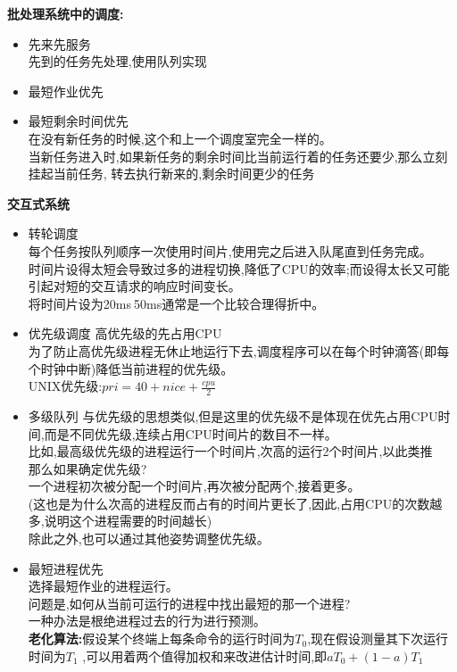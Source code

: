 \documentclass[UTF8,a4paper]{ctexart}
\newcommand{\spaceline}{\vspace{\baselineskip}}
\begin{document}
    \spaceline
    \textbf{批处理系统中的调度:}
    \begin{itemize}
      \item 先来先服务\\
      先到的任务先处理,使用队列实现
      \item 最短作业优先\\
      \item 最短剩余时间优先\\
      在没有新任务的时候,这个和上一个调度室完全一样的。\\
      当新任务进入时,如果新任务的剩余时间比当前运行着的任务还要少,那么立刻挂起当前任务,
      转去执行新来的,剩余时间更少的任务
    \end{itemize}

    \spaceline
    \textbf{交互式系统}
    \begin{itemize}
      \item 转轮调度\\
      每个任务按队列顺序一次使用时间片,使用完之后进入队尾直到任务完成。\\
      时间片设得太短会导致过多的进程切换,降低了CPU的效率;而设得太长又可能引起对短的交互请求的响应时间变长。\\
      将时间片设为20ms$~$50ms通常是一个比较合理得折中。

      \item 优先级调度
      高优先级的先占用CPU\\
      为了防止高优先级进程无休止地运行下去,调度程序可以在每个时钟滴答(即每个时钟中断)降低当前进程的优先级。\\
      UNIX优先级:$pri = 40 + nice + \frac{cpu}{2}$

      \item 多级队列
      与优先级的思想类似,但是这里的优先级不是体现在优先占用CPU时间,而是不同优先级,连续占用CPU时间片的数目不一样。\\
      比如,最高级优先级的进程运行一个时间片,次高的运行2个时间片,以此类推\\
      那么如果确定优先级?\\
      一个进程初次被分配一个时间片,再次被分配两个,接着更多。\\
      (这也是为什么次高的进程反而占有的时间片更长了,因此,占用CPU的次数越多,说明这个进程需要的时间越长)\\
      除此之外,也可以通过其他姿势调整优先级。

      \item 最短进程优先\\
      选择最短作业的进程运行。\\
      问题是,如何从当前可运行的进程中找出最短的那一个进程?\\
      一种办法是根绝进程过去的行为进行预测。\\
      \textbf{老化算法:}假设某个终端上每条命令的运行时间为$T_0$,现在假设测量其下次运行时间为$T_1$
      ,可以用着两个值得加权和来改进估计时间,即$aT_0 + (1 - a)T_1$


\end{itemize}
\end{document}
